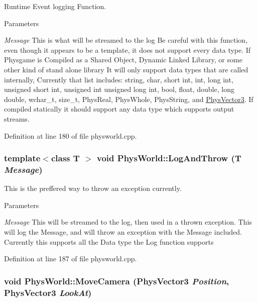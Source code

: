 Runtime Event logging Function. 
\begin{DoxyParams}{Parameters}
\item[{\em Message}]This is what will be streamed to the log Be careful with this function, even though it appears to be a template, it does not support every data type. If Physgame is Compiled as a Shared Object, Dynamic Linked Library, or some other kind of stand alone library It will only support data types that are called internally, Currently that list includes: string, char, short int, int, long int, unsigned short int, unsigned int unsigned long int, bool, float, double, long double, wchar\_\-t, size\_\-t, PhysReal, PhysWhole, PhysString, and \hyperlink{classPhysVector3}{PhysVector3}. If compiled statically it should support any data type which supports output streams. \end{DoxyParams}


Definition at line 180 of file physworld.cpp.\hypertarget{classPhysWorld_a1c2aeaed2a89821a4545db854da33ab8}{
\subsubsection[{LogAndThrow}]{\setlength{\rightskip}{0pt plus 5cm}template$<$class T $>$ void PhysWorld::LogAndThrow (T {\em Message})}}
\label{db/df5/classPhysWorld_a1c2aeaed2a89821a4545db854da33ab8}


This is the preffered way to throw an exception currently. 
\begin{DoxyParams}{Parameters}
\item[{\em Message}]This will be streamed to the log, then used in a thrown exception. This will log the Message, and will throw an exception with the Message included. Currently this supports all the Data type the Log function supports \end{DoxyParams}


Definition at line 187 of file physworld.cpp.\hypertarget{classPhysWorld_a1df24ee06d5881825902b60e0d81174a}{
\subsubsection[{MoveCamera}]{\setlength{\rightskip}{0pt plus 5cm}void PhysWorld::MoveCamera ({\bf PhysVector3} {\em Position}, \/  {\bf PhysVector3} {\em LookAt})}}
\label{db/df5/classPhysWorld_a1df24ee06d5881825902b60e0d81174a}


